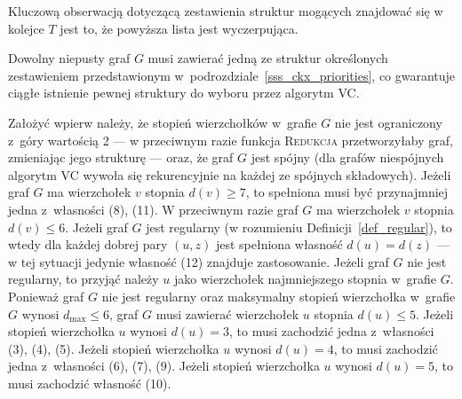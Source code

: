 {  Kluczową obserwacją dotyczącą zestawienia struktur mogących znajdować się w kolejce $T$ jest to, że powyższa lista jest wyczerpująca.
  \begin{theorem}
    Dowolny niepusty graf $G$ musi zawierać jedną ze struktur określonych zestawieniem przedstawionym w~podrozdziale~\ref{sss_ckx_priorities}, co gwarantuje ciągłe istnienie pewnej struktury do wyboru przez algorytm \textsc{VC}.
  \end{theorem}
  \begin{bproof}
    Założyć wpierw należy, że stopień wierzchołków w~grafie $G$ nie jest ograniczony z~góry wartością 2 --- w przeciwnym razie funkcja \textsc{Redukcja} przetworzyłaby graf, zmieniając jego strukturę --- oraz, że graf $G$ jest spójny (dla grafów niespójnych algorytm \textsc{VC} wywoła się rekurencyjnie na każdej ze spójnych składowych).
    Jeżeli graf $G$ ma wierzchołek $v$ stopnia $d(v) \geq 7$, to spełniona musi być przynajmniej jedna z~własności (8), (11).
    W przeciwnym razie graf $G$ ma wierzchołek $v$ stopnia $d(v) \leq 6$.
    Jeżeli graf $G$ jest regularny (w rozumieniu Definicji~\ref{def_regular}), to wtedy dla każdej dobrej pary $(u, z)$ jest spełniona własność $d(u)=d(z)$ --- w tej sytuacji jedynie własność (12) znajduje zastosowanie.
    Jeżeli graf $G$ nie jest regularny, to przyjąć należy $u$ jako wierzchołek najmniejszego stopnia w~grafie $G$.
    Ponieważ graf $G$ nie jest regularny oraz maksymalny stopień wierzchołka w~grafie $G$ wynosi $d_{\max} \leq 6$, graf $G$ musi zawierać wierzchołek $u$ stopnia $d(u) \leq 5$.
    Jeżeli stopień wierzchołka $u$ wynosi $d(u)=3$, to musi zachodzić jedna z~własności (3), (4), (5).
    Jeżeli stopień wierzchołka $u$ wynosi $d(u)=4$, to musi zachodzić jedna z~własności (6), (7), (9).
    Jeżeli stopień wierzchołka $u$ wynosi $d(u)=5$, to musi zachodzić własność (10).
  \end{bproof}
}
